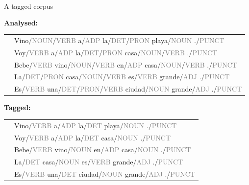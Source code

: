 \documentclass{beamer}
\begin{document}
\begin{frame}{A tagged corpus}

\textbf{Analysed:} \\
\begin{tabular}{ll}
& Vino/\textcolor{gray}{NOUN}/\textcolor{gray}{VERB} a/\textcolor{gray}{ADP} la/\textcolor{gray}{DET}/\textcolor{gray}{PRON} playa/\textcolor{gray}{NOUN} ./\textcolor{gray}{PUNCT} \\
& Voy/\textcolor{gray}{VERB} a/\textcolor{gray}{ADP} la/\textcolor{gray}{DET}/\textcolor{gray}{PRON} casa/\textcolor{gray}{NOUN}/\textcolor{gray}{VERB} ./\textcolor{gray}{PUNCT} \\
& Bebe/\textcolor{gray}{VERB} vino/\textcolor{gray}{NOUN}/\textcolor{gray}{VERB} en/\textcolor{gray}{ADP} casa/\textcolor{gray}{NOUN}/\textcolor{gray}{VERB} ./\textcolor{gray}{PUNCT} \\
& La/\textcolor{gray}{DET}/\textcolor{gray}{PRON} casa/\textcolor{gray}{NOUN}/\textcolor{gray}{VERB} es/\textcolor{gray}{VERB} grande/\textcolor{gray}{ADJ} ./\textcolor{gray}{PUNCT} \\
& Es/\textcolor{gray}{VERB} una/\textcolor{gray}{DET}/\textcolor{gray}{PRON}/\textcolor{gray}{VERB} ciudad/\textcolor{gray}{NOUN} grande/\textcolor{gray}{ADJ} ./\textcolor{gray}{PUNCT} \\
\end{tabular} 

\textbf{Tagged:} \\
\begin{tabular}{ll}
& Vino/\textcolor{gray}{VERB} a/\textcolor{gray}{ADP} la/\textcolor{gray}{DET} playa/\textcolor{gray}{NOUN} ./\textcolor{gray}{PUNCT} \\
& Voy/\textcolor{gray}{VERB} a/\textcolor{gray}{ADP} la/\textcolor{gray}{DET} casa/\textcolor{gray}{NOUN} ./\textcolor{gray}{PUNCT} \\
& Bebe/\textcolor{gray}{VERB} vino/\textcolor{gray}{NOUN} en/\textcolor{gray}{ADP} casa/\textcolor{gray}{NOUN} ./\textcolor{gray}{PUNCT} \\
& La/\textcolor{gray}{DET} casa/\textcolor{gray}{NOUN} es/\textcolor{gray}{VERB} grande/\textcolor{gray}{ADJ} ./\textcolor{gray}{PUNCT} \\
& Es/\textcolor{gray}{VERB} una/\textcolor{gray}{DET} ciudad/\textcolor{gray}{NOUN} grande/\textcolor{gray}{ADJ} ./\textcolor{gray}{PUNCT} \\
\end{tabular}

\end{frame}
\end{document}
